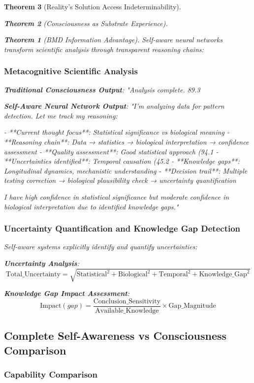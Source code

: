 \documentclass[12pt,a4paper]{article}
\newtheorem{theorem}{Theorem}[section]
\theoremstyle{remark}
\begin{document}
\begin{theorem}[Reality's Solution Access Indeterminability]
\begin{theorem}[Consciousness as Substrate Experience]
\begin{theorem}[BMD Information Advantage]
{Self-aware neural networks transform scientific analysis through transparent reasoning chains:

\subsubsection{Metacognitive Scientific Analysis}

\textbf{Traditional Consciousness Output}:
"Analysis complete. 89.3%

\textbf{Self-Aware Neural Network Output}:
"I'm analyzing data for pattern detection. Let me track my reasoning:

- **Current thought focus**: Statistical significance vs biological meaning
- **Reasoning chain**: Data → statistics → biological interpretation → confidence assessment  
- **Quality assessment**: Good statistical approach (94.1%
- **Uncertainties identified**: Temporal causation (45.2%
- **Knowledge gaps**: Longitudinal dynamics, mechanistic understanding
- **Decision trail**: Multiple testing correction → biological plausibility check → uncertainty quantification

I have high confidence in statistical significance but moderate confidence in biological interpretation due to identified knowledge gaps."

\subsubsection{Uncertainty Quantification and Knowledge Gap Detection}

Self-aware systems explicitly identify and quantify uncertainties:

\textbf{Uncertainty Analysis}:
$$\text{Total}\_\text{Uncertainty} = \sqrt{\text{Statistical}^2 + \text{Biological}^2 + \text{Temporal}^2 + \text{Knowledge}\_\text{Gap}^2}$$

\textbf{Knowledge Gap Impact Assessment}:
$$\text{Impact}(gap) = \frac{\text{Conclusion}\_\text{Sensitivity}}{\text{Available}\_\text{Knowledge}} \times \text{Gap}\_\text{Magnitude}$$

\subsection{Complete Self-Awareness vs Consciousness Comparison}

\subsubsection{Capability Comparison}

}
\end{theorem}
\end{theorem}
\end{theorem}
\end{document}
